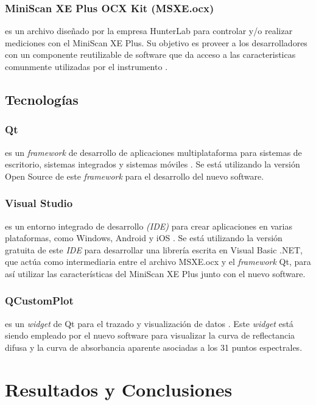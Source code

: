 \documentclass[conference]{IEEEtran}
\begin{document}
		\subsubsection{MiniScan XE Plus OCX Kit (MSXE.ocx)}
			es un archivo dise\~{n}ado por la empresa HunterLab para controlar y/o realizar mediciones con el MiniScan XE Plus. Su objetivo es proveer a los desarrolladores con un componente reutilizable de software que da acceso a las caracteristicas comunmente utilizadas por el instrumento \cite{MiniScanXEPlus-manual}.		
	
	\subsection{Tecnolog\'{i}as}
		\subsubsection{Qt}
			es un \textit{framework} de desarrollo de aplicaciones multiplataforma para sistemas de escritorio, sistemas integrados y sistemas m\'{o}viles \cite{Qt}. Se est\'{a} utilizando la versi\'{o}n Open Source de este \textit{framework} para el desarrollo del nuevo software.
			
		\subsubsection{Visual Studio}
			es un entorno integrado de desarrollo \textit{(IDE)} para crear aplicaciones en varias plataformas, como Windows, Android y iOS \cite{VS}. Se est\'{a} utilizando la versi\'{o}n gratuita de este \textit{IDE} para desarrollar una librer\'{i}a escrita en Visual Basic .NET, que act\'{u}a como intermediaria entre el archivo MSXE.ocx y el \textit{framework} Qt, para as\'{i} utilizar las caracter\'{i}sticas del MiniScan XE Plus junto con el nuevo software.

		\subsubsection{QCustomPlot}
			es un \textit{widget} de Qt para el trazado y visualizaci\'{o}n de datos \cite{QCustomPlot}. Este \textit{widget} est\'{a} siendo empleado por el nuevo software para visualizar la curva de reflectancia difusa y la curva de absorbancia aparente asociadas a los 31 puntos espectrales.

\section{Resultados y Conclusiones}
	
\end{document}
